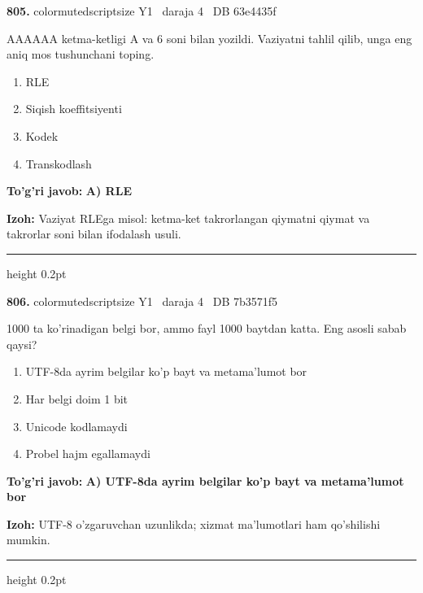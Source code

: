 \documentclass[10pt,a4paper,oneside]{article}
\begin{document}
\noindent\textbf{\color{ink}805.}  {color{muted}scriptsize Y1 \textbullet\ daraja 4 \textbullet\ DB 63e4435f}
\par
AAAAAA ketma-ketligi A va 6 soni bilan yozildi. Vaziyatni tahlil qilib, unga eng aniq mos tushunchani toping.
\begin{enumerate}[label=\Alph*),leftmargin=9mm]
\item RLE
\item Siqish koeffitsiyenti
\item Kodek
\item Transkodlash
\end{enumerate}
\begin{tcolorbox}[enhanced,breakable,colback=teal!4,colframe=teal!50!black,boxrule=0.5pt,arc=1.1mm,left=3mm,right=3mm,top=1.7mm,bottom=1.7mm,before skip=2mm,after skip=2mm]
\textbf{\color{teal}To'g'ri javob:} \textbf{A) RLE}
\par\smallskip
\textbf{Izoh:} Vaziyat RLEga misol: ketma-ket takrorlangan qiymatni qiymat va takrorlar soni bilan ifodalash usuli.
\end{tcolorbox}
\vspace{2mm}\hrule height 0.2pt \vspace{3mm}

\noindent\textbf{\color{ink}806.}  {color{muted}scriptsize Y1 \textbullet\ daraja 4 \textbullet\ DB 7b3571f5}
\par
1000 ta ko'rinadigan belgi bor, ammo fayl 1000 baytdan katta. Eng asosli sabab qaysi?
\begin{enumerate}[label=\Alph*),leftmargin=9mm]
\item UTF-8da ayrim belgilar ko'p bayt va metama'lumot bor
\item Har belgi doim 1 bit
\item Unicode kodlamaydi
\item Probel hajm egallamaydi
\end{enumerate}
\begin{tcolorbox}[enhanced,breakable,colback=teal!4,colframe=teal!50!black,boxrule=0.5pt,arc=1.1mm,left=3mm,right=3mm,top=1.7mm,bottom=1.7mm,before skip=2mm,after skip=2mm]
\textbf{\color{teal}To'g'ri javob:} \textbf{A) UTF-8da ayrim belgilar ko'p bayt va metama'lumot bor}
\par\smallskip
\textbf{Izoh:} UTF-8 o'zgaruvchan uzunlikda; xizmat ma'lumotlari ham qo'shilishi mumkin.
\end{tcolorbox}
\vspace{2mm}\hrule height 0.2pt \vspace{3mm}
\end{document}
